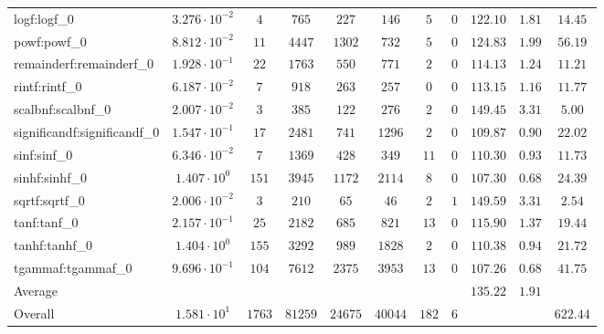 \begin{tabular}{|l|c|c|c|c|c|c|c|c|c|c|}
logf:logf\_0                 & $ 3.276 \cdot 10^{-2} $ & $ 4      $ & $ 765   $ & $ 227   $ & $ 146   $ & $ 5   $ & $ 0 $ & $ 122.10      $ & $ 1.81    $ & $ 14.45   $ \\
powf:powf\_0                 & $ 8.812 \cdot 10^{-2} $ & $ 11     $ & $ 4447  $ & $ 1302  $ & $ 732   $ & $ 5   $ & $ 0 $ & $ 124.83      $ & $ 1.99    $ & $ 56.19   $ \\
remainderf:remainderf\_0     & $ 1.928 \cdot 10^{-1} $ & $ 22     $ & $ 1763  $ & $ 550   $ & $ 771   $ & $ 2   $ & $ 0 $ & $ 114.13      $ & $ 1.24    $ & $ 11.21   $ \\
rintf:rintf\_0               & $ 6.187 \cdot 10^{-2} $ & $ 7      $ & $ 918   $ & $ 263   $ & $ 257   $ & $ 0   $ & $ 0 $ & $ 113.15      $ & $ 1.16    $ & $ 11.77   $ \\
scalbnf:scalbnf\_0           & $ 2.007 \cdot 10^{-2} $ & $ 3      $ & $ 385   $ & $ 122   $ & $ 276   $ & $ 2   $ & $ 0 $ & $ 149.45      $ & $ 3.31    $ & $ 5.00    $ \\
significandf:significandf\_0 & $ 1.547 \cdot 10^{-1} $ & $ 17     $ & $ 2481  $ & $ 741   $ & $ 1296  $ & $ 2   $ & $ 0 $ & $ 109.87      $ & $ 0.90    $ & $ 22.02   $ \\
sinf:sinf\_0                 & $ 6.346 \cdot 10^{-2} $ & $ 7      $ & $ 1369  $ & $ 428   $ & $ 349   $ & $ 11  $ & $ 0 $ & $ 110.30      $ & $ 0.93    $ & $ 11.73   $ \\
sinhf:sinhf\_0               & $ 1.407 \cdot 10^{0}  $ & $ 151    $ & $ 3945  $ & $ 1172  $ & $ 2114  $ & $ 8   $ & $ 0 $ & $ 107.30      $ & $ 0.68    $ & $ 24.39   $ \\
sqrtf:sqrtf\_0               & $ 2.006 \cdot 10^{-2} $ & $ 3      $ & $ 210   $ & $ 65    $ & $ 46    $ & $ 2   $ & $ 1 $ & $ 149.59      $ & $ 3.31    $ & $ 2.54    $ \\
tanf:tanf\_0                 & $ 2.157 \cdot 10^{-1} $ & $ 25     $ & $ 2182  $ & $ 685   $ & $ 821   $ & $ 13  $ & $ 0 $ & $ 115.90      $ & $ 1.37    $ & $ 19.44   $ \\
tanhf:tanhf\_0               & $ 1.404 \cdot 10^{0}  $ & $ 155    $ & $ 3292  $ & $ 989   $ & $ 1828  $ & $ 2   $ & $ 0 $ & $ 110.38      $ & $ 0.94    $ & $ 21.72   $ \\
tgammaf:tgammaf\_0           & $ 9.696 \cdot 10^{-1} $ & $ 104    $ & $ 7612  $ & $ 2375  $ & $ 3953  $ & $ 13  $ & $ 0 $ & $ 107.26      $ & $ 0.68    $ & $ 41.75   $ \\
\hline
Average                      & $                     $ & $        $ & $       $ & $       $ & $       $ & $     $ & $   $ & $ 135.22      $ & $ 1.91    $ & $         $ \\
\hline
Overall                      & $ 1.581 \cdot 10^{1}  $ & $ 1763   $ & $ 81259 $ & $ 24675 $ & $ 40044 $ & $ 182 $ & $ 6 $ & $             $ & $         $ & $ 622.44  $ \\
\hline
\end{tabular}

